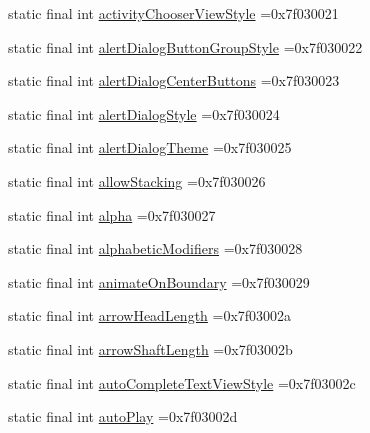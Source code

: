 \begin{DoxyCompactItemize}
static final int \mbox{\hyperlink{classcom_1_1example_1_1trainawearapplication_1_1_r_1_1attr_ac317500bc42aeb6cafff51366aea0580}{activity\+Chooser\+View\+Style}} =0x7f030021
\item 
static final int \mbox{\hyperlink{classcom_1_1example_1_1trainawearapplication_1_1_r_1_1attr_ac9c61feb1a5972c37e64aba37edeed64}{alert\+Dialog\+Button\+Group\+Style}} =0x7f030022
\item 
static final int \mbox{\hyperlink{classcom_1_1example_1_1trainawearapplication_1_1_r_1_1attr_afb22bc3f111584aea687be4d832fddc8}{alert\+Dialog\+Center\+Buttons}} =0x7f030023
\item 
static final int \mbox{\hyperlink{classcom_1_1example_1_1trainawearapplication_1_1_r_1_1attr_a437ddf73fe1b4b8d493425f91c7f036a}{alert\+Dialog\+Style}} =0x7f030024
\item 
static final int \mbox{\hyperlink{classcom_1_1example_1_1trainawearapplication_1_1_r_1_1attr_a2ba65c9f0736319ac149fa6cf48e7488}{alert\+Dialog\+Theme}} =0x7f030025
\item 
static final int \mbox{\hyperlink{classcom_1_1example_1_1trainawearapplication_1_1_r_1_1attr_ae6b1c463dc3624654ebc0819712051e2}{allow\+Stacking}} =0x7f030026
\item 
static final int \mbox{\hyperlink{classcom_1_1example_1_1trainawearapplication_1_1_r_1_1attr_a0d1a0f9af4f6d73138c7ccf3852dd17a}{alpha}} =0x7f030027
\item 
static final int \mbox{\hyperlink{classcom_1_1example_1_1trainawearapplication_1_1_r_1_1attr_a90b75c95fd245f34ae18b145027ff730}{alphabetic\+Modifiers}} =0x7f030028
\item 
static final int \mbox{\hyperlink{classcom_1_1example_1_1trainawearapplication_1_1_r_1_1attr_a432a000c59a38764c044a159ceb8b590}{animate\+On\+Boundary}} =0x7f030029
\item 
static final int \mbox{\hyperlink{classcom_1_1example_1_1trainawearapplication_1_1_r_1_1attr_a02d178210d3da1cd85057dcae90a88f0}{arrow\+Head\+Length}} =0x7f03002a
\item 
static final int \mbox{\hyperlink{classcom_1_1example_1_1trainawearapplication_1_1_r_1_1attr_a433c81e577de7a99c53f6e2397938ee0}{arrow\+Shaft\+Length}} =0x7f03002b
\item 
static final int \mbox{\hyperlink{classcom_1_1example_1_1trainawearapplication_1_1_r_1_1attr_af48345cbccc6a9208c52fbc16d582e6e}{auto\+Complete\+Text\+View\+Style}} =0x7f03002c
\item 
static final int \mbox{\hyperlink{classcom_1_1example_1_1trainawearapplication_1_1_r_1_1attr_af90b86296052277a57c2a5decdb1e2de}{auto\+Play}} =0x7f03002d

\end{DoxyCompactItemize}
